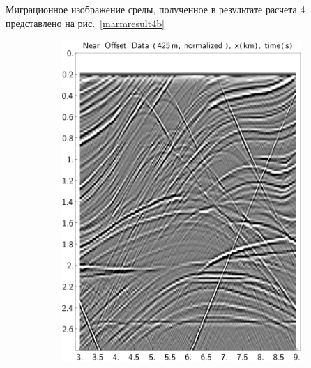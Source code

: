 \documentclass{article}
\newcommand  {\figref  } [1]     {рис.~\ref{#1}}
\begin{document}
Миграционное изображение среды, полученное в результате расчета 4 представлено на \figref{marmresult4b}
%
\begin{figure}[tb]
\centering
\begin{subfigure}{.5\textwidth}\includegraphics[width=\textwidth]{pic/report_april/no_seism_norm}\end{subfigure}%

\end{figure}
\end{document}
